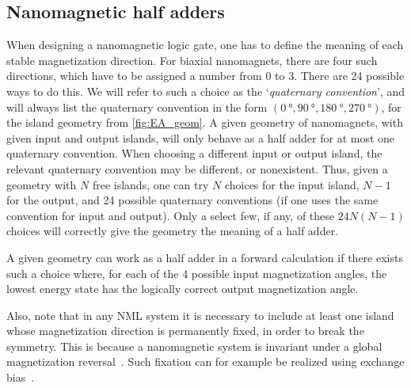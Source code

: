 \documentclass[twocolumn]{phdsymp}
\begin{document}
\subsection{Nanomagnetic half adders}
When designing a nanomagnetic logic gate, one has to define the meaning of each stable magnetization direction. For biaxial nanomagnets, there are four such directions, which have to be assigned a number from 0 to 3. There are 24 possible ways to do this. We will refer to such a choice as the `\textit{quaternary convention}', and will always list the quaternary convention in the form $(\SI{0}{\degree}, \SI{90}{\degree}, \SI{180}{\degree}, \SI{270}{\degree})$, for the island geometry from \cref{fig:EA_geom}. A given geometry of nanomagnets, with given input and output islands, will only behave as a half adder for at most one quaternary convention. When choosing a different input or output island, the relevant quaternary convention may be different, or nonexistent. Thus, given a geometry with $N$ free islands, one can try $N$ choices for the input island, $N-1$ for the output, and 24 possible quaternary conventions (if one uses the same convention for input and output). Only a select few, if any, of these $24N(N-1)$ choices will correctly give the geometry the meaning of a half adder. \par
A given geometry can work as a half adder in a forward calculation if there exists such a choice where, for each of the 4 possible input magnetization angles, the lowest energy state has the logically correct output magnetization angle. \par
Also, note that in any NML system it is necessary to include at least one island whose magnetization direction is permanently fixed, in order to break the symmetry. This is because a nanomagnetic system is invariant under a global magnetization reversal~\cite{GYP-18}. Such fixation can for example be realized using exchange bias~\cite{ExchangeBias,ExchangeBias_nanostructures,ExchangeBias_Mechanisms}.
\end{document}

